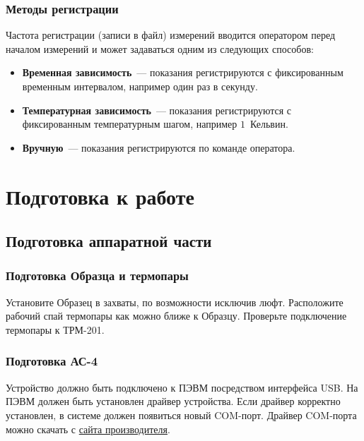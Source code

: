 \documentclass[12pt, a4paper, twocolumn]{report}
\begin{document}
\subsection{Методы регистрации}

\label{sec_registration_types}

Частота регистрации (записи в файл) измерений вводится оператором перед началом измерений и может задаваться одним из следующих способов:

\begin{itemize}
\item {\bf Временная зависимость}~--- показания регистрируются с фиксированным временным интервалом, например один раз в секунду.
\item {\bf Температурная зависимость}~--- показания регистрируются с фиксированным температурным шагом, например $1$~Кельвин.
\item \label{sec_reg_type_manual} {\bf Вручную}~--- показания регистрируются по команде оператора.
\end{itemize}

\chapter{Подготовка к работе}

\section{Подготовка аппаратной части}

\subsection{Подготовка Образца и термопары}

Установите Образец в захваты, по возможности исключив люфт. Расположите рабочий спай термопары как можно ближе к Образцу. Проверьте подключение термопары к ТРМ-201.

\subsection{Подготовка АС-4}

Устройство должно быть подключено к ПЭВМ посредством интерфейса USB. На ПЭВМ должен быть установлен драйвер устройства. Если драйвер корректно установлен, в системе должен появиться новый COM-порт. Драйвер COM-порта можно скачать с \href{http://www.owen.ru/catalog/avtomaticheskij_preobrazovatel_interfejsov_usb_rs_485_owen_as4/opisanie}{сайта производителя}.
\end{document}
